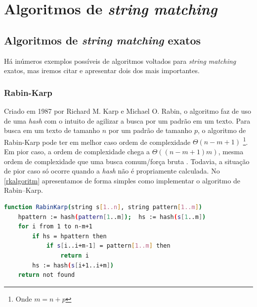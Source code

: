 \section{\nmu Algoritmos de  \textit{string matching}} %
\label{sec:algoritimos_de_textit}

\subsection{\nmu Algoritmos de \textit{string matching} exatos} %
\label{sub:algoritimos_de_textit}

Há inúmeros exemplos possíveis de algoritmos voltados para \textit{string matching} exatos, mas iremos citar e apresentar dois dos mais importantes.

\subsubsection*{Rabin-Karp} %
\label{ssub:rabin_karp}

Criado  em 1987  por  Richard M. Karp e Michael O. Rabin, o algoritmo faz de uso de uma \textit{hash} com o intuito de agilizar a busca por um padrão em um texto. Para busca em um texto de tamanho $n$ por um padrão de tamanho $p$, o algoritmo de Rabin-Karp pode ter em melhor caso ordem de complexidade $\Theta(n-m+1)$ \cite{paulo2015algoritmos}\footnote{Onde $m=n+p$}. Em pior caso, a ordem de complexidade chega a $\Theta((n-m+1)m)$, mesma ordem de complexidade que uma busca comum/força bruta \cite{paulo2015algoritmos}. Todavia, a situação de pior caso só ocorre quando a \textit{hash} não é propriamente calculada. No \autoref{rkalgoritm} apresentamos de forma simples como implementar o algoritmo de Rabin–Karp.

\begin{lstlisting}[language=Bash,label=rkalgoritm,caption={Algoritmo de Rabin–Karp}]
function RabinKarp(string s[1..n], string pattern[1..m])
	hpattern := hash(pattern[1..m]);  hs := hash(s[1..m])
	for i from 1 to n-m+1
		if hs = hpattern then
			if s[i..i+m-1] = pattern[1..m] then
				return i
		hs := hash(s[i+1..i+m])
	return not found
\end{lstlisting}

